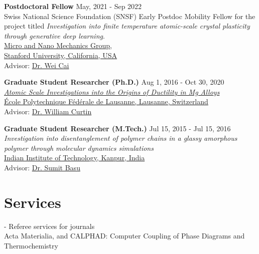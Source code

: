 \documentclass[margin,line]{resume}
\begin{document}
\begin{resume}
    \textbf{\textsf{Postdoctoral Fellow}}    \hfill  \small{May, 2021 - Sep 2022} \\
    Swiss National Science Foundation (SNSF) Early Postdoc Mobility Fellow for the project titled \textit{Investigation into finite temperature atomic-scale crystal plasticity through generative deep learning}.\\
    \href{https://micronano.stanford.edu/}{Micro and Nano Mechanics Group}, \\
    \href{https://www.stanford.edu/}{Stanford University, California, USA}\\
    Advisor:  \href{https://web.stanford.edu/~caiwei/}{Dr. Wei Cai}




    \textbf{\textsf{Graduate Student Researcher (Ph.D.)}}    \hfill  \small{Aug 1, 2016 - Oct 30, 2020} \\
    \href{https://infoscience.epfl.ch/record/280981}{\textit{Atomic Scale Investigations into the Origins of Ductility in Mg Alloys}}\\
    \href{https://www.epfl.ch/en/}{\'Ecole Polytechnique F\'ed\'erale de Lausanne, Lausanne, Switzerland}\\
    Advisor:  \href{https://people.epfl.ch//william.curtin?lang=en}{Dr. William Curtin}


    \textbf{\textsf{Graduate Student Researcher (M.Tech.)}} \hfill \small{Jul 15, 2015 - Jul 15, 2016} \\
    \textit{Investigation into disentanglement of polymer chains in a glassy amorphous polymer through molecular dynamics simulations}   \\
    \href{http://www.iitk.ac.in/}{Indian Institute of Technology, Kanpur, India}\\
    Advisor: \href{http://home.iitk.ac.in/~sbasu/}{Dr. Sumit Basu}

    \clearpage

    \section{\mysidestyle Services}
    - Referee services for journals \\
    \hspace*{0.5cm} Acta Materialia, and CALPHAD: Computer Coupling of Phase Diagrams and Thermochemistry


\end{resume}
\end{document}
